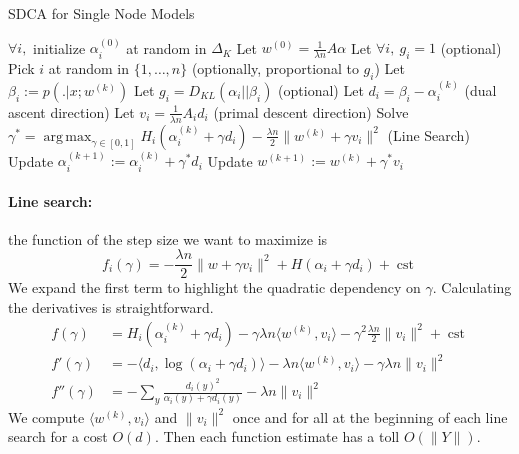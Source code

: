 \documentclass{article}
\DeclareMathOperator{\cst}{cst}
\DeclareMathOperator{\1}{\mathbb{1}}
\DeclareMathOperator*{\argmax}{arg\,max}
\begin{document}
\begin{algorithm}[ht]
    \caption{SDCA for Single Node Models}%
    \label{sdca for logreg}
\begin{algorithmic}
        \STATE $\forall i,$ initialize $\alpha_i^{(0)}$ at random in $\Delta_K$
        \STATE Let $w^{(0)} = \frac{1}{\lambda n} A \alpha$  
        \STATE Let $\forall i,\  g_i = 1$ (optional)
                \STATE Pick $i$ at random in $\{1,\ldots,n\}$ (optionally, proportional to $g_i$)
                \STATE Let $ \beta_i := p( . |x ; w^{(k)})$
                \STATE Let $g_i = D_{KL}(\alpha_i || \beta_i)$ (optional)
                \STATE Let $d_i = \beta_i - \alpha_i^{(k)}$ (dual ascent direction)
                \STATE Let $v_i = \frac{1}{\lambda n} A_i d_i $ (primal descent direction)
                \STATE Solve $\gamma^* = \argmax_{\gamma \in [0,1]} H_i(\alpha_i^{(k)} + \gamma d_i) - \frac{\lambda n}{2} \| w^{(k)} + \gamma v_i \|^2$ (Line Search)
               \STATE Update $\alpha_i^{(k+1)} := \alpha_i^{(k)} + \gamma^* d_i$
               \STATE Update $w^{(k+1)} := w^{(k)} + \gamma^* v_i $
        \ENDFOR
\end{algorithmic}
\end{algorithm}


\paragraph{Line search:} 
the function of the step size we want to maximize is 
\begin{equation*}
	\label{line search 1}
	f_i(\gamma) = -\frac{\lambda n}{2} \|w + \gamma v_i\|^2 + H(\alpha_i + \gamma d_i) + \cst
\end{equation*}
We expand the first term to highlight the quadratic dependency on $\gamma$.
Calculating the derivatives is straightforward.
\begin{align*}
	f(\gamma)
	& = H_i(\alpha_i^{(k)} + \gamma d_i)
	- \gamma \lambda n  \langle w^{(k)} , v_i \rangle 
	- \gamma^2 \frac{\lambda n}{2} \|v_i \|^2
	+ \cst
	\\
	f'(\gamma) & =  - \langle d_i, \log(\alpha_i + \gamma d_i) \rangle
	- \lambda n \langle w^{(k)} , v_i \rangle 
	- \gamma \lambda n \|v_i \|^2 
	\\
	f''(\gamma) & = - \sum_{y} \frac{d_{i}(y)^2 }{ \alpha_i(y) + \gamma d_i(y) }
	- \lambda n  \|v_i \|^2 
\end{align*}
We compute $\langle w^{(k)} , v_i \rangle$ and $ \|v_i \|^2$ once and for all at the beginning of each line search for a cost $O(d)$. Then each function estimate has a toll $O(\|Y\|)$.
\end{document}
